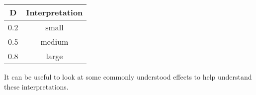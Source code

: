 \documentclass[]{book}
\theoremstyle{definition}
\theoremstyle{definition}
\theoremstyle{definition}
\theoremstyle{remark}
\begin{document}
\begin{longtable}[]{@{}cc@{}}
\toprule
\begin{minipage}[b]{0.08\columnwidth}\centering\strut
D\strut
\end{minipage} & \begin{minipage}[b]{0.21\columnwidth}\centering\strut
Interpretation\strut
\end{minipage}\tabularnewline
\midrule
\endhead
\begin{minipage}[t]{0.08\columnwidth}\centering\strut
0.2\strut
\end{minipage} & \begin{minipage}[t]{0.21\columnwidth}\centering\strut
small\strut
\end{minipage}\tabularnewline
\begin{minipage}[t]{0.08\columnwidth}\centering\strut
0.5\strut
\end{minipage} & \begin{minipage}[t]{0.21\columnwidth}\centering\strut
medium\strut
\end{minipage}\tabularnewline
\begin{minipage}[t]{0.08\columnwidth}\centering\strut
0.8\strut
\end{minipage} & \begin{minipage}[t]{0.21\columnwidth}\centering\strut
large\strut
\end{minipage}\tabularnewline
\bottomrule
\end{longtable}

It can be useful to look at some commonly understood effects to help
understand these interpretations.
\end{document}
